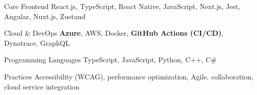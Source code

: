 
\begin{cvskills}

  \cvskill
  {Core Frontend}
  {React.js, TypeScript, React Native, JavaScript, Next.js, Jest, Angular, Nuxt.js, Zustand}
  
  \cvskill
  {Cloud \& DevOps}
  {\textbf{Azure}, AWS, Docker, \textbf{GitHub Actions (CI/CD)}, Dynatrace, GraphQL}

  \cvskill
  {Programming Languages}
  {TypeScript, JavaScript, Python, C++, C\#}

  \cvskill
  {Practices}
  {Accessibility (WCAG), performance optimization, Agile, collaboration, cloud service integration}
\end{cvskills}
